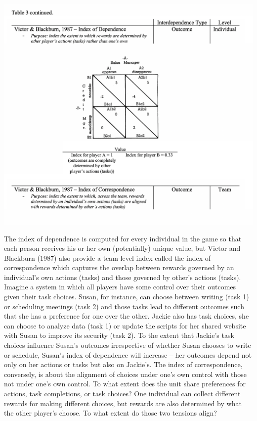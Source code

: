\documentclass[english,,man]{apa6}
\theoremstyle{definition}
\theoremstyle{definition}
\theoremstyle{definition}
\theoremstyle{remark}
\begin{document}
\includegraphics{images/table3c.png}

The index of dependence is computed for every individual in the game so
that each person receives his or her own (potentially) unique value, but
Victor and Blackburn (1987) also provide a team-level index called the
index of correspondence which captures the overlap between rewards
governed by an individual's own actions (tasks) and those governed by
other's actions (tasks). Imagine a system in which all players have some
control over their outcomes given their task choices. Susan, for
instance, can choose between writing (task 1) or scheduling meetings
(task 2) and those tasks lead to different outcomes such that she has a
preference for one over the other. Jackie also has task choices, she can
choose to analyze data (task 1) or update the scripts for her shared
website with Susan to improve its security (task 2). To the extent that
Jackie's task choices influence Susan's outcomes irrespective of whether
Susan chooses to write or schedule, Susan's index of dependence will
increase -- her outcomes depend not only on her actions or tasks but
also on Jackie's. The index of correspondence, conversely, is about the
alignment of choices under one's own control with those not under one's
own control. To what extent does the unit share preferences for actions,
task completions, or task choices? One individual can collect different
rewards for making different choices, but rewards are also determined by
what the other player's choose. To what extent do those two tensions
align?
\end{document}
